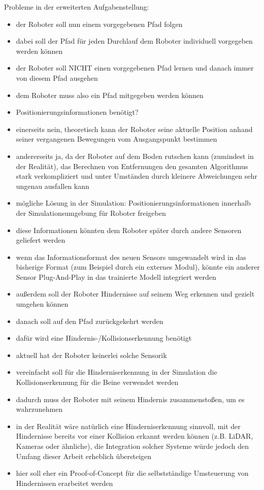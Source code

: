 Probleme in der erweiterten Aufgabenstellung:
\begin{itemize}
    \item der Roboter soll nun einem vorgegebenen Pfad folgen
    \item dabei soll der Pfad für jeden Durchlauf dem Roboter individuell vorgegeben werden können
    \item der Roboter soll NICHT einen vorgegebenen Pfad lernen und danach immer von diesem Pfad ausgehen
    \item dem Roboter muss also ein Pfad mitgegeben werden können
    
    \item Positionierungsinformationen benötigt?
    \item einerseits nein, theoretisch kann der Roboter seine aktuelle Position anhand seiner vergangenen Bewegungen vom Ausgangspunkt bestimmen
    \item andererseits ja, da der Roboter auf dem Boden rutschen kann (zumindest in der Realität), das Berechnen von Entfernungen den gesamten Algorithmus stark verkompliziert und unter Umständen durch kleinere Abweichungen sehr ungenau ausfallen kann
    \item mögliche Lösung in der Simulation: Positionierungsinformationen innerhalb der Simulationsumgebung für Roboter freigeben
    \item diese Informationen könnten dem Roboter später durch andere Sensoren geliefert werden
    \item wenn das Informationsformat des neuen Sensors umgewandelt wird in das bisherige Format (zum Beispiel durch ein externes Modul), könnte ein anderer Sensor Plug-And-Play in das trainierte Modell integriert werden
    
    \item außerdem soll der Roboter Hindernisse auf seinem Weg erkennen und gezielt umgehen können
    \item danach soll auf den Pfad zurückgekehrt werden
    \item dafür wird eine Hindernis-/Kollisionserkennung benötigt
    \item aktuell hat der Roboter keinerlei solche Sensorik
    \item vereinfacht soll für die Hinderniserkennung in der Simulation die Kollisionserkennung für die Beine verwendet werden
    \item dadurch muss der Roboter mit seinem Hindernis zusammenstoßen, um es wahrzunehmen
    \item in der Realität wäre natürlich eine Hinderniserkennung sinnvoll, mit der Hindernisse bereits vor einer Kollision erkannt werden können (z.B. LiDAR, Kameras oder ähnliche), die Integration solcher Systeme würde jedoch den Umfang dieser Arbeit erheblich übersteigen
    \item hier soll eher ein Proof-of-Concept für die selbstständige Umsteuerung von Hindernissen erarbeitet werden
    

\end{itemize}
